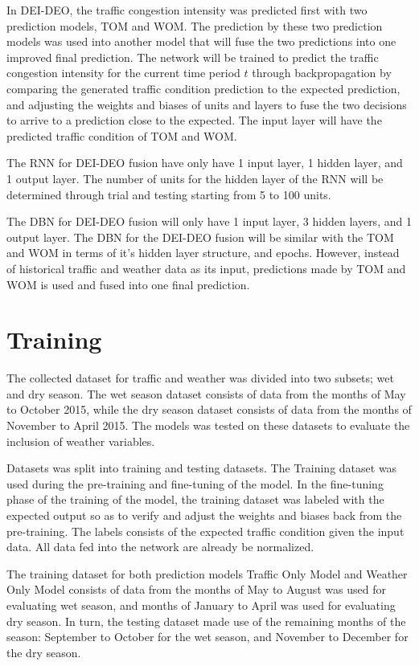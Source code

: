 In DEI-DEO, the traffic congestion intensity was predicted first with two prediction models, TOM and WOM. The prediction by these two prediction models was used into another model that will fuse the two predictions into one improved final prediction. The network will be trained to predict the traffic congestion intensity for the current time period $t$ through backpropagation by comparing the generated traffic condition prediction to the expected prediction, and adjusting the weights and biases of units and layers to fuse the two decisions to arrive to a prediction close to the expected. The input layer will have the predicted traffic condition of TOM and WOM. 

The RNN for DEI-DEO fusion have only have 1 input layer, 1 hidden layer, and 1 output layer. The number of units for the hidden layer of the RNN will be determined through trial and testing starting from 5 to 100 units. 

The DBN for DEI-DEO fusion will only have 1 input layer, 3 hidden layers, and 1 output layer. The DBN for the DEI-DEO fusion will be similar with the TOM and WOM in terms of it’s hidden layer structure, and epochs. However, instead of historical traffic and weather data as its input, predictions made by TOM and WOM is used and fused into one final prediction. 

\section{Training}
The collected dataset for traffic and weather was divided into two subsets; wet and dry season. The wet season dataset consists of data from the months of May to October 2015, while the dry season dataset consists of data from the months of November to April 2015. The models was tested on these datasets to evaluate the inclusion of weather variables. 

Datasets was split into training and testing datasets. The Training dataset was used during the pre-training and fine-tuning of the model. In the fine-tuning phase of the training of the model, the training dataset was labeled with the expected output so as to verify and adjust the weights and biases back from the pre-training. The labels consists of the expected traffic condition given the input data. All data fed into the network are already be normalized. 

The training dataset for both prediction models Traffic Only Model and Weather Only Model consists of data from the months of May to August was used for evaluating wet season, and months of January to April was used for evaluating dry season. In turn, the testing dataset made use of the remaining months of the season: September to October for the wet season, and November to December for the dry season.  

